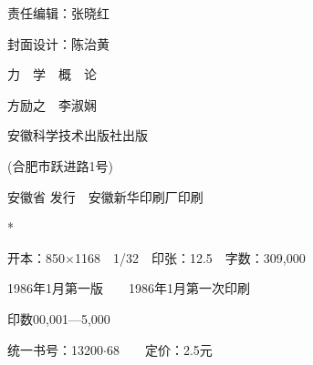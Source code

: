 \begin{center}
    \fangsong \mbox{}

    \mbox{}

    责任编辑：张晓红

    封面设计：陈治黄

    \vfill \heiti 力~~学~~概~~论

    \normalsize \kaishu 方励之~~李淑娴

    \normalfont *

    安徽科学技术出版社出版

     (合肥市跃进路1号)

    \normalsize 安徽省%
    \hspace{0.2em}\hspace{0.2em}%
    发行~~安徽新华印刷厂印刷

    *

    开本：850$\times$1168~~1/32~~印张：12.5~~字数：309,000

    1986年1月第一版~~~~1986年1月第一次印刷

    印数00,001—5,000

    \normalsize 统一书号：13200$\cdot$68~~~~定价：2.5元
\end{center}
\thispagestyle{empty}
\clearpage
